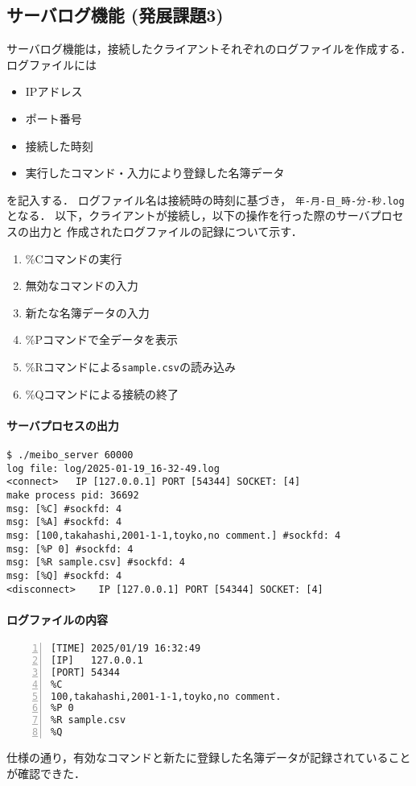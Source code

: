 \subsection{サーバログ機能 (発展課題3)}
サーバログ機能は，接続したクライアントそれぞれのログファイルを作成する．
ログファイルには
\begin{itemize}
  \item IPアドレス
  \item ポート番号
  \item 接続した時刻
  \item 実行したコマンド・入力により登録した名簿データ
\end{itemize}
を記入する．
ログファイル名は接続時の時刻に基づき，
\verb|年-月-日_時-分-秒.log|となる．
以下，クライアントが接続し，以下の操作を行った際のサーバプロセスの出力と
作成されたログファイルの記録について示す．
\begin{enumerate}
  \item \%Cコマンドの実行
  \item 無効なコマンドの入力
  \item 新たな名簿データの入力
  \item \%Pコマンドで全データを表示
  \item \%Rコマンドによる\verb|sample.csv|の読み込み
  \item \%Qコマンドによる接続の終了
\end{enumerate}

\paragraph*{サーバプロセスの出力}
\begin{Verbatim}[numbers=none, numbersep=6pt, frame=single,
  fontsize=\small, baselinestretch=0.8]
$ ./meibo_server 60000
log file: log/2025-01-19_16-32-49.log
<connect> 	IP [127.0.0.1] PORT [54344] SOCKET: [4]
make process pid: 36692
msg: [%C] #sockfd: 4
msg: [%A] #sockfd: 4
msg: [100,takahashi,2001-1-1,toyko,no comment.] #sockfd: 4
msg: [%P 0] #sockfd: 4
msg: [%R sample.csv] #sockfd: 4
msg: [%Q] #sockfd: 4
<disconnect> 	IP [127.0.0.1] PORT [54344] SOCKET: [4]
\end{Verbatim}

\paragraph*{ログファイルの内容}
\begin{Verbatim}[numbers=left, numbersep=6pt, frame=single, xleftmargin=10mm,
  fontsize=\small, baselinestretch=0.8]
[TIME] 2025/01/19 16:32:49
[IP]   127.0.0.1
[PORT] 54344
%C
100,takahashi,2001-1-1,toyko,no comment.
%P 0
%R sample.csv
%Q
\end{Verbatim}
仕様の通り，有効なコマンドと新たに登録した名簿データが記録されていることが確認できた．


